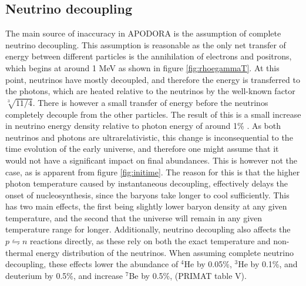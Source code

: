 \subsection{Neutrino decoupling}
\label{sec:decoupling}
The main source of inaccuracy in APODORA is the assumption of complete neutrino decoupling. This assumption is reasonable as the only net transfer of energy between different particles is the annihilation of electrons and positrons, which begins at around 1 MeV as shown in figure \ref{fig:rhoegammaT}. At this point, neutrinos have mostly decoupled, and therefore the energy is transferred to the photons, which are heated relative to the neutrinos by the well-known factor $\sqrt[3]{11/4}$. There is however a small transfer of energy before the neutrinos completely decouple from the other particles. The result of this is a small increase in neutrino energy density relative to photon energy of around 1\% \cite{Hannestad:1995rs}. As both neutrinos and photons are ultrarelativistic, this change is inconsequential to the time evolution of the early universe, and therefore one might assume that it would not have a significant impact on final abundances. This is however not the case, as is apparent from figure \ref{fig:initime}. The reason for this is that the higher photon temperature caused by instantaneous decoupling, effectively delays the onset of nucleosynthesis, since the baryons take longer to cool sufficiently. This has two main effects, the first being slightly lower baryon density at any given temperature, and the second that the universe will remain in any given temperature range for longer. Additionally, neutrino decoupling also affects the $p\leftrightharpoons n$ reactions directly, as these rely on both the exact temperature and non-thermal energy distribution of the neutrinos. When assuming complete neutrino decoupling, these effects lower the abundance of ${}^4$He by 0.05\%, ${}^3$He by 0.1\%, and deuterium by 0.5\%, and increase ${}^7$Be by 0.5\%, (PRIMAT table V\cite{PRIMAT}). 

